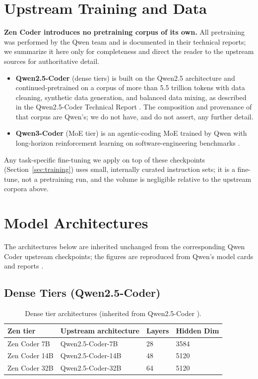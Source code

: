 \documentclass[11pt,a4paper]{article}
\begin{document}
\section{Upstream Training and Data}

\textbf{Zen Coder introduces no pretraining corpus of its own.} All pretraining was performed by the
Qwen team and is documented in their technical reports; we summarize it here only for completeness and
direct the reader to the upstream sources for authoritative detail.

\begin{itemize}
    \item \textbf{Qwen2.5-Coder} (dense tiers) is built on the Qwen2.5 architecture and
          continued-pretrained on a corpus of more than 5.5 trillion tokens with data cleaning,
          synthetic data generation, and balanced data mixing, as described in the Qwen2.5-Coder
          Technical Report \cite{qwen25coder}. The composition and provenance of that corpus are
          Qwen's; we do not have, and do not assert, any further detail.
    \item \textbf{Qwen3-Coder} (MoE tier) is an agentic-coding MoE trained by Qwen with long-horizon
          reinforcement learning on software-engineering benchmarks \cite{qwen3coder}.
\end{itemize}

\noindent Any task-specific fine-tuning we apply on top of these checkpoints (Section~\ref{sec:training})
uses small, internally curated instruction sets; it is a fine-tune, not a pretraining run, and the
volume is negligible relative to the upstream corpora above.

\section{Model Architectures}

The architectures below are inherited unchanged from the corresponding Qwen Coder upstream
checkpoints; the figures are reproduced from Qwen's model cards and reports
\cite{qwen25coder,qwen3coder}.

\subsection{Dense Tiers (Qwen2.5-Coder)}

\begin{table}[H]
\centering
\begin{tabular}{llll}
\toprule
\textbf{Zen tier} & \textbf{Upstream architecture} & \textbf{Layers} & \textbf{Hidden Dim} \\
\midrule
Zen Coder 7B  & Qwen2.5-Coder-7B  & 28 & 3584 \\
Zen Coder 14B & Qwen2.5-Coder-14B & 48 & 5120 \\
Zen Coder 32B & Qwen2.5-Coder-32B & 64 & 5120 \\
\bottomrule
\end{tabular}
\caption{Dense tier architectures (inherited from Qwen2.5-Coder \cite{qwen25coder}).}
\end{table}
\end{document}

